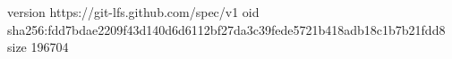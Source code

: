 version https://git-lfs.github.com/spec/v1
oid sha256:fdd7bdae2209f43d140d6d6112bf27da3c39fede5721b418adb18c1b7b21fdd8
size 196704
